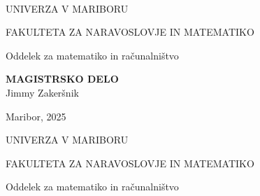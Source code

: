 \documentclass[12pt,a4paper,oneside,fleqn,openany]{book}
\begin{document}

\cleardoublepage
\cleardoublepage
\pagestyle{empty}
$ $
\begin{center}
\large
UNIVERZA V MARIBORU

FAKULTETA ZA NARAVOSLOVJE IN MATEMATIKO

Oddelek za matematiko in ra\v cunalni\v stvo
\end{center}

\vspace{4cm}


\begin{center}
\vspace{1cm}
{\Huge \bfseries MAGISTRSKO DELO\\}
\vspace{2cm}
{\Large Jimmy Zakeršnik}
\end{center}
\vspace*{\fill}
\vspace*{\fill}

\begin{flushright}
\vspace{1cm}\end{flushright}

\begin{center}


\vspace{2cm}


{\large Maribor, 2025}
\end{center}




\newpage
\newoddpage

\begin{center}
\large
UNIVERZA V MARIBORU

FAKULTETA ZA NARAVOSLOVJE IN MATEMATIKO

Oddelek za matematiko in ra\v cunalni\v stvo
\end{center}

\vspace{3cm}
\end{document}
